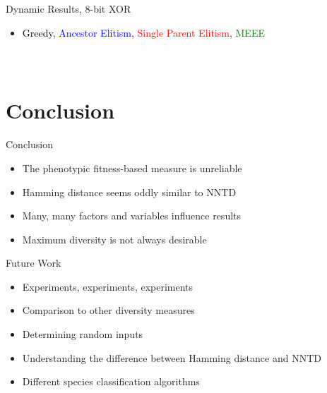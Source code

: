 \begin{frame}[t]{Dynamic Results, 8-bit XOR}
  \begin{itemize}
    \item \textcolor{black}{Greedy}, \textcolor{blue}{Ancestor Elitism}, \textcolor{red}{Single Parent Elitism}, \textcolor{green}{MEEE}
  \end{itemize}

  \begin{columns}[T]
    \begin{figure}
      \centering
      \batchmode
      \scrollmode
    \end{figure}
    \vfill
    \begin{figure}
      \centering
      \batchmode
      \scrollmode
    \end{figure}
    \begin{figure}
      \centering
      \batchmode
      \scrollmode
    \end{figure}
    \begin{figure}
      \centering
      \batchmode
      \scrollmode
    \end{figure}
  \end{columns}

\end{frame}

\section{Conclusion}
\begin{frame}{Conclusion}
  \begin{itemize}
    \item The phenotypic fitness-based measure is unreliable
    \item Hamming distance seems oddly similar to NNTD
    \item Many, many factors and variables influence results
    \item Maximum diversity is not always desirable
  \end{itemize}
\end{frame}

\begin{frame}{Future Work}
  \begin{itemize}
    \item Experiments, experiments, experiments
    \item Comparison to other diversity measures
    \item Determining random inputs %
    \item Understanding the difference between Hamming distance and NNTD
    \item Different species classification algorithms
  \end{itemize}
\end{frame}

